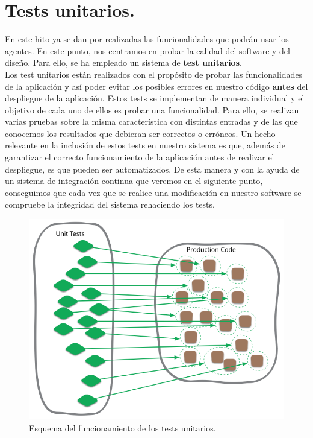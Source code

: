 \section{Tests unitarios.}

En este hito ya se dan por realizadas las funcionalidades que podrán usar los agentes. En este punto, nos centramos en probar la calidad del software y del diseño.
Para ello, se ha empleado un sistema de \textbf{test unitarios}.\\

Los test unitarios están realizados con el propósito de probar las funcionalidades de la aplicación y así poder evitar los posibles errores en nuestro código \textbf{antes}
del despliegue de la aplicación. Estos tests se implementan de manera individual y el objetivo de cada uno de ellos es probar una funcionalidad. Para ello, se realizan varias
pruebas sobre la misma característica con distintas entradas y de las que conocemos los resultados que debieran ser correctos o erróneos. Un hecho relevante en la inclusión
de estos tests en nuestro sistema es que, además de garantizar el correcto funcionamiento de la aplicación antes de realizar el despliegue, es que pueden ser automatizados. 
De esta manera y con la ayuda de un sistema de integración continua que veremos en el siguiente punto, conseguimos que cada vez que se realice una modificación en nuestro software
se compruebe la integridad del sistema rehaciendo los tests.\\

\begin{figure}[H]
	\centering
	\includegraphics[scale=0.45]{imagenes/unit-test.png}
	\caption{Esquema del funcionamiento de los tests unitarios.\cite{image-unit-test}}
\end{figure}

